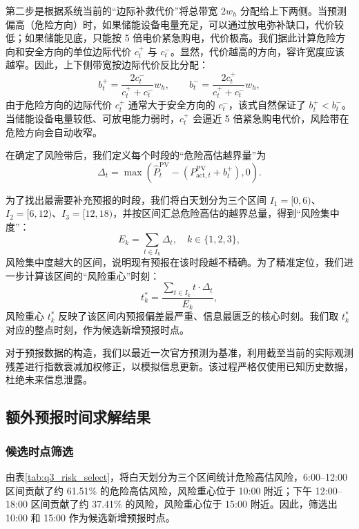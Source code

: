 \documentclass[withoutpreface,bwprint]{cumcmthesis}
\begin{document}
第二步是根据系统当前的“边际补救代价”将总带宽 $2w_h$ 分配给上下两侧。当预测偏高（危险方向）时，如果储能设备电量充足，可以通过放电弥补缺口，代价较低；如果储能见底，只能按 5 倍电价紧急购电，代价极高。我们据此计算危险方向和安全方向的单位边际代价 $c_t^+$ 与 $c_t^-$。显然，代价越高的方向，容许宽度应该越窄。因此，上下侧带宽按边际代价反比分配：
\begin{equation}
	b^{+}_t = \frac{2c^{-}_t}{c^{+}_t + c^{-}_t} w_h, \qquad b^{-}_t = \frac{2c^{+}_t}{c^{+}_t + c^{-}_t} w_h,
	\label{eq:q3bandwidth}
\end{equation}
由于危险方向的边际代价 $c_t^+$ 通常大于安全方向的 $c_t^-$，该式自然保证了 $b^{+}_t < b^{-}_t$。当储能设备电量较低、可放电能力弱时，$c_t^+$ 会逼近 5 倍紧急购电代价，风险带在危险方向会自动收窄。

在确定了风险带后，我们定义每个时段的“危险高估越界量”为 
\begin{equation}
\Delta_t = \max\left(\hat{P}^{\mathrm{PV}}_t - (P^{\mathrm{PV}}_{\mathrm{act},t} + b^{+}_t), 0\right).
\end{equation}

为了找出最需要补充预报的时段，我们将白天划分为三个区间 $I_1=[0, 6)$、$I_2=[6, 12)$、$I_3=[12, 18)$，并按区间汇总危险高估的越界总量，得到“风险集中度”：
\begin{equation}
	E_k = \sum_{t \in I_k} \Delta_t, \quad k\in\{1,2,3\},
	\label{eq:q3risksum}
\end{equation}
风险集中度越大的区间，说明现有预报在该时段越不精确。为了精准定位，我们进一步计算该区间的“风险重心”时刻：
\begin{equation}
	t_k^* = \frac{\sum_{t \in I_k} t \cdot \Delta_t}{E_k},
	\label{eq:q3centroid}
\end{equation}
风险重心 $t_k^*$ 反映了该区间内预报偏差最严重、信息最匮乏的核心时刻。我们取 $t_k^*$ 对应的整点时刻，作为候选新增预报时点。

对于预报数据的构造，我们以最近一次官方预测为基准，利用截至当前的实际观测残差进行指数衰减加权修正，以模拟信息更新。该过程严格仅使用已知历史数据，杜绝未来信息泄露。

\subsection{额外预报时间求解结果}

\subsubsection{候选时点筛选}

由表\ref{tab:q3_risk_select}，将白天划分为三个区间统计危险高估风险，6:00--12:00 区间贡献了约 61.51\% 的危险高估风险，风险重心位于 10:00 附近；下午 12:00--18:00 区间贡献了约 37.41\% 的风险，风险重心位于 15:00 附近。因此，筛选出 10:00 和 15:00 作为候选新增预报时点。
\end{document}
